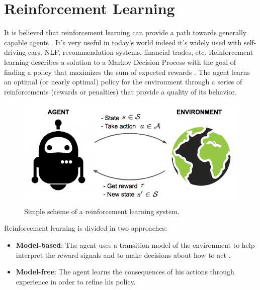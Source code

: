 \section{Reinforcement Learning}
\label{sec:rl}
It is believed that reinforcement learning can provide a path towards generally capable agents \cite{silver2021reward} \cite{parker2022automated}.
It's very useful in today's world indeed it's widely used with self-driving cars, NLP, recommendation systems, financial trades, etc.
%
Reinforcement learning \cite{sutton2018reinforcement} describes a solution to a Markov Decision Process
with the goal of finding a policy that maximizes the sum of expected rewards \cite{huys2014reward}.
%
The agent learns an optimal (or nearly optimal) policy for the environment \cite{russell2002artificial}
through a series of reinforcements (rewards or penalties) that provide a quality of its behavior.

\begin{figure}[ht]
    \centering
    \includegraphics[scale=0.4]{images/RL_illustration.png}
    \caption{Simple scheme of a reinforcement learning system.}
    \label{fig:RL_illustration}
\end{figure}

\noindent
Reinforcement learning is divided in two approaches:
\begin{itemize}
    \item \textbf{Model-based}:
          The agent uses a transition model of the environment to help interpret the reward signals and to make decisions about how to act \cite{russell2021artificial}.
    \item \textbf{Model-free}:
          The agent learns the consequences of his actions through experience in order to refine his policy.
\end{itemize}

